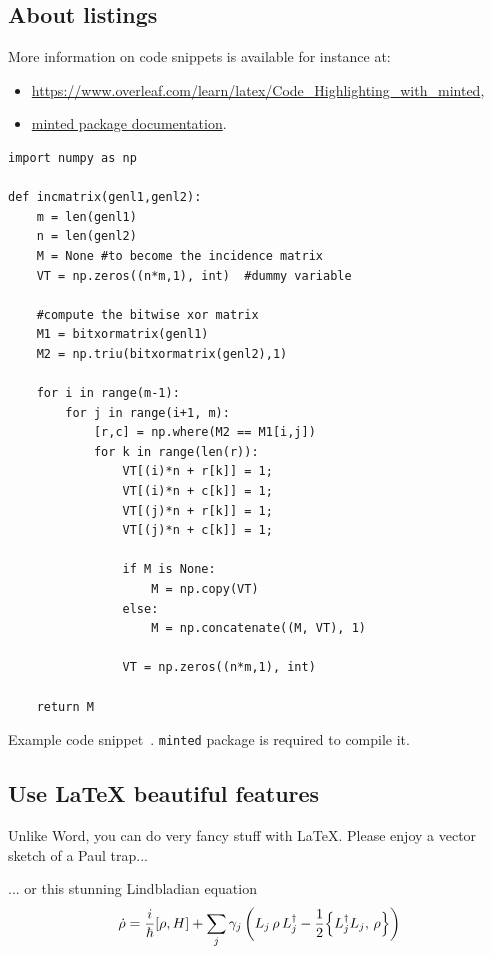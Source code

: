 \subsection{About listings}
More information on code snippets is available for instance at:
\begin{itemize}
    \item \url{https://www.overleaf.com/learn/latex/Code_Highlighting_with_minted},
    \item \href{https://repo.skni.umcs.pl/ctan/macros/latex/contrib/minted/minted.pdf}{minted package documentation}.
\end{itemize}


\begin{longlisting}
\begin{verbatim}
import numpy as np
    
def incmatrix(genl1,genl2):
    m = len(genl1)
    n = len(genl2)
    M = None #to become the incidence matrix
    VT = np.zeros((n*m,1), int)  #dummy variable
    
    #compute the bitwise xor matrix
    M1 = bitxormatrix(genl1)
    M2 = np.triu(bitxormatrix(genl2),1) 

    for i in range(m-1):
        for j in range(i+1, m):
            [r,c] = np.where(M2 == M1[i,j])
            for k in range(len(r)):
                VT[(i)*n + r[k]] = 1;
                VT[(i)*n + c[k]] = 1;
                VT[(j)*n + r[k]] = 1;
                VT[(j)*n + c[k]] = 1;
                
                if M is None:
                    M = np.copy(VT)
                else:
                    M = np.concatenate((M, VT), 1)
                
                VT = np.zeros((n*m,1), int)
    
    return M
\end{verbatim}
\caption{Example code snippet~\cite{code}. \texttt{minted} package is required to compile it.}
\label{code:example}
\end{longlisting}
\fi




\subsection{Use LaTeX beautiful features}


Unlike Word, you can do very fancy stuff with \LaTeX. Please enjoy a vector sketch of a Paul trap...

\begin{center}
\scalebox{1.2}{
    
}
\end{center}
... or this stunning Lindbladian equation
\begin{equation}
    \dot{\rho} = \frac{i}{\hbar} [\rho,H] + \sum_j \gamma_j \left( L_j \, \rho \,  L_j^\dagger - \frac{1}{2} \Bigl\{ L_j^\dagger L_j, \, \rho \Bigr\} \right)
    \label{eq:Lindblad}
\end{equation}





